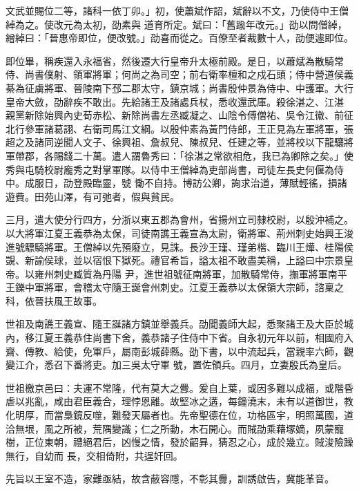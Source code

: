 \begin{pinyinscope}
 文武並賜位二等，諸科一依丁卯。」初，使蕭斌作詔，斌辭以不文，乃使侍中王僧綽為之。使改元為太初，劭素與
 道育所定。斌曰：「舊踰年改元。」劭以問僧綽，繒綽曰：「晉惠帝即位，便改號。」劭喜而從之。百僚至者裁數十人，劭便遽即位。



 即位畢，稱疾還入永福省，然後遷大行皇帝升太極前殿。是日，以蕭斌為散騎常侍、尚書僕射、領軍將軍；何尚之為司空；前右衛率檀和之戍石頭；侍中營道侯義綦為征虜將軍、晉陵南下邳二郡太守，鎮京城；尚書殷仲景為侍中、中護軍。大行皇帝大斂，劭辭疾不敢出。先給諸王及諸處兵杖，悉收還武庫。殺徐湛之、江湛
 親黨新除始興內史荀赤松、新除尚書左丞臧凝之、山陰令傅僧祐、吳令江徽、前征北行參軍諸葛詡、右衛司馬江文綱。以殷仲素為黃門侍郎，王正見為左軍將軍，張超之及諸同逆聞人文子、徐興祖、詹叔兒、陳叔兒、任建之等，並將校以下龍驤將軍帶郡，各賜錢二十萬。遣人謂魯秀曰：「徐湛之常欲相危，我已為卿除之矣。」使秀與屯騎校尉龐秀之對掌軍隊。以侍中王僧綽為吏部尚書，司徒左長史何偃為侍中。成服日，劭登殿臨靈，號
 慟不自持。博訪公卿，詢求治道，薄賦輕徭，損諸遊費。田苑山澤，有可弛者，假與貧民。



 三月，遣大使分行四方，分浙以東五郡為會州，省揚州立司隸校尉，以殷沖補之。以大將軍江夏王義恭為太保，司徒南譙王義宣為太尉，衛將軍、荊州刺史始興王浚進號驃騎將軍。王僧綽以先預廢立，見誅。長沙王瑾、瑾弟楷、臨川王燁、桂陽侯覬、新諭侯球，並以宿恨下獄死。禮官希旨，謚太祖不敢盡美稱，上謚曰中宗景皇帝。以雍州刺史臧質為丹陽
 尹，進世祖號征南將軍，加散騎常侍，撫軍將軍南平王鑠中軍將軍，會稽太守隨王誕會州刺史。江夏王義恭以太保領大宗師，諮稟之科，依晉扶風王故事。



 世祖及南譙王義宣、隨王誕諸方鎮並舉義兵。劭聞義師大起，悉聚諸王及大臣於城內，移江夏王義恭住尚書下舍，義恭諸子住侍中下省。自永初元年以前，相國府入齋、傳教、給使，免軍戶，屬南彭城薛縣。劭下書，以中流起兵，當親率六師，觀變江介，悉召下番將吏。加三吳太守軍
 號，置佐領兵。四月，立妻殷氏為皇后。



 世祖檄京邑曰：夫運不常隆，代有莫大之釁。爰自上葉，或因多難以成福，或階昏虐以兆亂，咸由君臣義合，理悖恩離。故堅冰之遘，每鐘澆末，未有以道御世，教化明厚，而當梟鏡反噬，難發天屬者也。先帝聖德在位，功格區宇，明照萬國，道洽無垠，風之所被，荒隅變識；仁之所動，木石開心。而賊劭乘藉塚嫡，夙蒙寵樹，正位東朝，禮絕君后，凶慢之情，發於齠昪，猜忍之心，成於幾立。賊浚險躁無行，自幼而
 長，交相倚附，共逞奸回。



 先旨以王室不造，家難亟結，故含蔽容隱，不彰其釁，訓誘啟告，冀能革音。




\end{pinyinscope}
